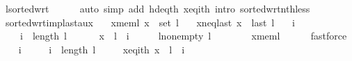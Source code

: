 \begin{isabellebody}
\ l{\isacharunderscore}{\kern0pt}sorted{\isacharunderscore}{\kern0pt}wrt\isanewline
\ \ \ \ \isamarkupfalse%
\ {\isacharparenleft}{\kern0pt}auto\ simp\ add{\isacharcolon}{\kern0pt}\ hd{\isacharunderscore}{\kern0pt}eq{\isacharunderscore}{\kern0pt}{}th\ x{\isacharunderscore}{\kern0pt}eq{\isacharunderscore}{\kern0pt}ith\ intro{\isacharcolon}{\kern0pt}\ sorted{\isacharunderscore}{\kern0pt}wrt{\isacharunderscore}{\kern0pt}nth{\isacharunderscore}{\kern0pt}less{\isacharparenright}{\kern0pt}\isanewline
{}\isamarkupfalse%
%
\endisatagproof
{\isafoldproof}%
%
\isadelimproof
\isanewline
%
\endisadelimproof
\isanewline
{}\isamarkupfalse%
\ sorted{\isacharunderscore}{\kern0pt}wrt{\isacharunderscore}{\kern0pt}imp{\isacharunderscore}{\kern0pt}last{\isacharunderscore}{\kern0pt}aux{\isacharcolon}{\kern0pt}\isanewline
\ \ \ x{\isacharunderscore}{\kern0pt}mem{\isacharunderscore}{\kern0pt}l{\isacharcolon}{\kern0pt}\ {\isachardoublequoteopen}x\ {\isasymin}\ set\ l{\isachardoublequoteclose}\isanewline
\ \ \ x{\isacharunderscore}{\kern0pt}neq{\isacharunderscore}{\kern0pt}last{\isacharcolon}{\kern0pt}\ {\isachardoublequoteopen}x\ {\isasymnoteq}\ last\ l{\isachardoublequoteclose}\isanewline
\ \ \ i\ \isanewline
\ \ \ \ {\isachardoublequoteopen}i\ {\isacharless}{\kern0pt}\ length\ l\ {\isacharminus}{\kern0pt}\ {}{\isachardoublequoteclose}\isanewline
\ \ \ \ {\isachardoublequoteopen}x\ {\isacharequal}{\kern0pt}\ l\ {\isacharbang}{\kern0pt}\ i{\isachardoublequoteclose}\isanewline
%
\isadelimproof
%
\endisadelimproof
%
\isatagproof
{}\isamarkupfalse%
\ {\isacharminus}{\kern0pt}\isanewline
\ \ \isamarkupfalse%
\ l{\isacharunderscore}{\kern0pt}non{\isacharunderscore}{\kern0pt}empty{\isacharcolon}{\kern0pt}\ {\isachardoublequoteopen}l\ {\isasymnoteq}\ {\isacharbrackleft}{\kern0pt}{\isacharbrackright}{\kern0pt}{\isachardoublequoteclose}\isanewline
\ \ \ \ \isamarkupfalse%
\ x{\isacharunderscore}{\kern0pt}mem{\isacharunderscore}{\kern0pt}l\isanewline
\ \ \ \ \isamarkupfalse%
\ fastforce\isanewline
\ \ \isamarkupfalse%
\ i\ \isanewline
\ \ \ \ {\isachardoublequoteopen}i\ {\isacharless}{\kern0pt}\ length\ l{\isachardoublequoteclose}\ \isanewline
\ \ \ \ x{\isacharunderscore}{\kern0pt}eq{\isacharunderscore}{\kern0pt}ith{\isacharcolon}{\kern0pt}\ {\isachardoublequoteopen}x\ {\isacharequal}{\kern0pt}\ l\ {\isacharbang}{\kern0pt}\ i{\isachardoublequoteclose}\isanewline

\end{isabellebody}
